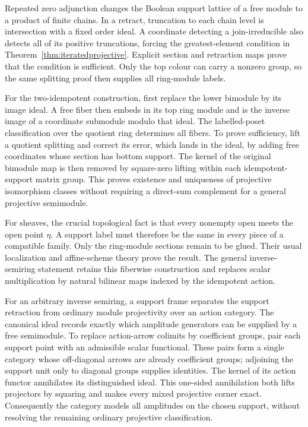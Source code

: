\documentclass[11pt]{amsart}
\theoremstyle{definition}
\theoremstyle{remark}
\begin{document}
Repeated zero adjunction changes the Boolean support lattice of a free module to a product of finite chains. In a retract, truncation to each chain level is intersection with a fixed order ideal. A coordinate detecting a join-irreducible also detects all of its positive truncations, forcing the greatest-element condition in Theorem~\ref{thm:iteratedprojective}. Explicit section and retraction maps prove that the condition is sufficient. Only the top colour can carry a nonzero group, so the same splitting proof then supplies all ring-module labels.

For the two-idempotent construction, first replace the lower bimodule by its image ideal. A free fiber then embeds in its top ring module and is the inverse image of a coordinate submodule modulo that ideal. The labelled-poset classification over the quotient ring determines all fibers. To prove sufficiency, lift a quotient splitting and correct its error, which lands in the ideal, by adding free coordinates whose section has bottom support. The kernel of the original bimodule map is then removed by square-zero lifting within each idempotent-support matrix group. This proves existence and uniqueness of projective isomorphism classes without requiring a direct-sum complement for a general projective semimodule.

For sheaves, the crucial topological fact is that every nonempty open meets the open point $\eta$. A support label must therefore be the same in every piece of a compatible family. Only the ring-module sections remain to be glued. Their usual localization and affine-scheme theory prove the result. The general inverse-semiring statement retains this fiberwise construction and replaces scalar multiplication by natural bilinear maps indexed by the idempotent action.

For an arbitrary inverse semiring, a support frame separates the support retraction from ordinary module projectivity over an action category. The canonical ideal records exactly which amplitude generators can be supplied by a free semimodule. To replace action-arrow colimits by coefficient groups, pair each support point with an admissible scalar functional. These pairs form a single category whose off-diagonal arrows are already coefficient groups; adjoining the support unit only to diagonal groups supplies identities. The kernel of its action functor annihilates its distinguished ideal. This one-sided annihilation both lifts projectors by squaring and makes every mixed projective corner exact. Consequently the category models all amplitudes on the chosen support, without resolving the remaining ordinary projective classification.
\end{document}
